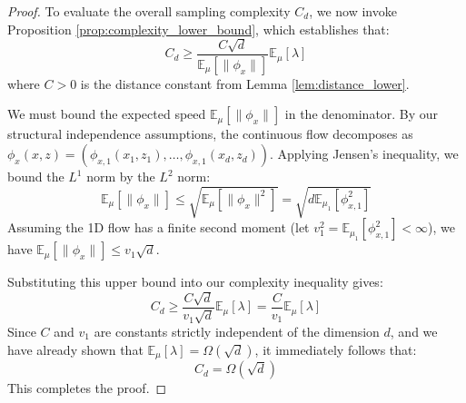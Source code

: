 \documentclass[10pt,a4paper]{amsart}
\begin{document}
\begin{proof}
        To evaluate the overall sampling complexity $C_d$, we now invoke Proposition \ref{prop:complexity_lower_bound}, which establishes that:
    \[
        C_d \geq \frac{C \sqrt{d}}{\mathbb{E}_\mu[\|\phi_x\|]} \mathbb{E}_\mu[\lambda]
    \]
    where $C > 0$ is the distance constant from Lemma \ref{lem:distance_lower}. 
    
    We must bound the expected speed $\mathbb{E}_\mu[\|\phi_x\|]$ in the denominator. By our structural independence assumptions, the continuous flow decomposes as $\phi_x(x,z) = (\phi_{x,1}(x_1,z_1), \dots, \phi_{x,1}(x_d,z_d))$. Applying Jensen's inequality, we bound the $L^1$ norm by the $L^2$ norm:
    \[
        \mathbb{E}_\mu[\|\phi_x\|] \le \sqrt{\mathbb{E}_\mu[\|\phi_x\|^2]}  = \sqrt{d \mathbb{E}_{\mu_1}[\phi_{x,1}^2]}
    \]
    Assuming the 1D flow has a finite second moment (let $v_1^2 = \mathbb{E}_{\mu_1}[\phi_{x,1}^2] < \infty$), we have $\mathbb{E}_\mu[\|\phi_x\|] \le v_1 \sqrt{d}$.
    
    Substituting this upper bound into our complexity inequality gives:
    \[
        C_d \geq \frac{C \sqrt{d}}{v_1 \sqrt{d}} \mathbb{E}_\mu[\lambda] = \frac{C}{v_1} \mathbb{E}_\mu[\lambda]
    \]
    Since $C$ and $v_1$ are constants strictly independent of the dimension $d$, and we have already shown that $\mathbb{E}_\mu[\lambda] = \Omega(\sqrt{d})$, it immediately follows that:
    \[
        C_d = \Omega(\sqrt{d})
    \]
    This completes the proof.
\end{proof}
\end{document}
